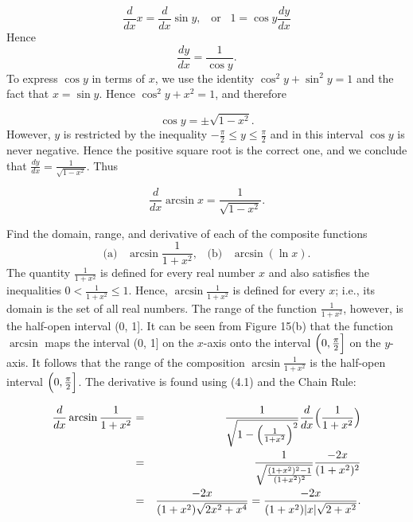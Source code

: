 $$
\frac{d}{dx} x = \frac{d}{dx} \sin y,  \;\;\; \mbox{or}\;\;\; 1 = \cos y \frac{dy}{dx}
$$
Hence
$$
\frac{dy}{dx} = \frac{1}{\cos y}.
$$
\noindent To express $\cos y$ in terms of $x$, we use the identity $\cos^{2} y + \sin^{2} y = 1$ 
and the fact that $x = \sin y$.  Hence $\cos^{2} y + x^{2} = 1$, and therefore

$$
\cos y = \pm \sqrt {1 - x^2} .
$$
However, $y$ is restricted by the inequality $-\frac{\pi}{2} \leq y \leq \frac{\pi}{2}$ and in this interval $\cos y$ is never negative. Hence the positive square root is the correct one, and we conclude that $\frac{dy}{dx}  = \frac{1}{\sqrt{1 - x^2}}$. Thus

\begin{theorem} %
$$
\frac{d}{dx} \arcsin x = \frac{1}{\sqrt{1 - x^2}}.
$$
\end{theorem}

\begin{example} 
Find the domain, range, and derivative of each of the composite functions
$$
\mbox{(a)}\;\;\; \arcsin \frac{1}{1 + x^2}, \;\;\; \mbox{(b)}\;\;\; \arcsin(\ln x).
$$
The quantity $\frac{1}{1 + x^2}$ is defined for every real number $x$ and also satisfies the inequalities $0 < \frac{1}{1 + x^{2}} \leq 1$. Hence, $\arcsin \frac{1}{1 + x^{2}}$ is defined for every $x$; i.e., its domain is the set of all real numbers. The range of the function $\frac{1}{1 + x^{2}}$, however, is the half-open interval (0, 1].  It can be seen from Figure 15(b) that the function $\arcsin$ maps the interval (0, 1] on the $x$-axis onto the interval $\Bigl(0, \frac{\pi}{2}\Bigr]$ on the $y$-axis. It follows that the range of the composition $\arcsin \frac{1}{1 + x^{2}}$ is the half-open interval $\Bigl(0, \frac{\pi}{2}\Bigr]$. The derivative is found using (4.1) and the Chain Rule:


\begin{eqnarray*}
\frac{d}{dx} \arcsin \frac{1}{1 + x^{2}} 
&=& \frac{1}{\sqrt{1 - \Bigl(\frac{1}{1 + x^2}\Bigr)^2}} \frac{d}{dx} \Bigl(\frac{1}{1 + x^2}\Bigr) \\
&=& \frac{1}{\sqrt {   \frac{(1 + x^2)^2 - 1}{(1 + x^2)^2}  } } \frac{-2x}{(1 + x^2)^2}    \\
&=& \frac{-2x}{(1 + x^2) \sqrt {2x^{2} + x^{4}}}= \frac{-2x}{(1 + x^2) |x| \sqrt {2 + x^2}}.
\end{eqnarray*} 
\end{example}



